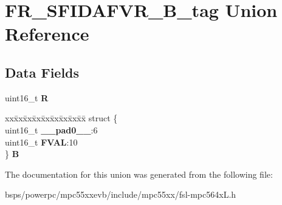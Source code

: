 \hypertarget{unionFR__SFIDAFVR__16B__tag}{}\section{F\+R\+\_\+\+S\+F\+I\+D\+A\+F\+V\+R\+\_\+B\+\_\+tag Union Reference}
\label{unionFR__SFIDAFVR__16B__tag}
\subsection*{Data Fields}
\begin{DoxyCompactItemize}
\item 
\mbox{\label{unionFR__SFIDAFVR__16B__tag_a8371a227079949b0b82548cd5996a458}} 
uint16\+\_\+t {\bfseries R}
\item 
\mbox{\label{unionFR__SFIDAFVR__16B__tag_afcaec1f86eeac0b1db7b00394e6e0609}} 
\begin{tabbing}
xx\=xx\=xx\=xx\=xx\=xx\=xx\=xx\=xx\=\kill
struct \{\\
\>uint16\_t {\bfseries \_\_pad0\_\_}:6\\
\>uint16\_t {\bfseries FVAL}:10\\
\} {\bfseries B}\\

\end{tabbing}\end{DoxyCompactItemize}


The documentation for this union was generated from the following file\+:\begin{DoxyCompactItemize}
\item 
bsps/powerpc/mpc55xxevb/include/mpc55xx/fsl-\/mpc564x\+L.\+h\end{DoxyCompactItemize}
